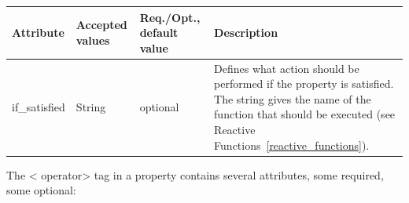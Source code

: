 \begin{table}[H]
\label{prop_attb}
    \begin{adjustwidth}{-2in}{-.5in} 
        \begin{center}
\begin{supertabular}{|m{1.0281599in}|m{1.0281599in}|m{1.0281599in}|m{3.44206in}|}
\hline
{}
 Attribute &
 Accepted values &
 Req./Opt., default value &
 Description
\\\hline
if\_satisfied &
String &
optional &
Defines what action should be performed if the property is satisfied. 
The string gives the name of the function that should be executed (see Reactive Functions~\ref{reactive_functions}).
\\\hline
\end{supertabular}
        \end{center}
    \end{adjustwidth}
\end{table}



 The {\textless} operator{\textgreater} tag in a property contains
several attributes, some required, some optional:


